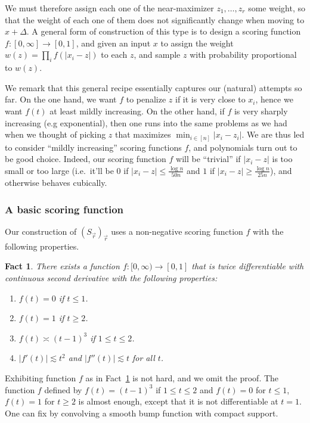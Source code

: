 \documentclass[10pt,a4paper]{article}
\newtheorem{fact}[thm]{Fact}
\newcommand\card[1]{\left| {#1} \right|}
\renewcommand\geq{\geqslant}
\renewcommand\leq{\leqslant}
\newcommand{\De}{\Delta}
\def\ll{\lesssim}
\def\ee{\asymp}
\begin{document}
We must therefore assign each one of the near-maximizer $z_1,\ldots,z_r$ some weight, so that the weight of each one of them does not significantly change when
moving to $x+\De$. A general form of construction of this type is to design a scoring function $f\colon[0,\infty]\to[0,1]$, and given an input $x$ to assign
the weight $w(z) = \prod\limits_{i}{f(\card{x_i - z})}$ to each $z$, and sample $z$ with probability proportional to $w(z)$.

We remark that this general recipe essentially captures our (natural) attempts so far. On the one hand, we want $f$ to penalize $z$
if it is very close to $x_i$, hence we want $f(t)$ at least mildly increasing. On the other hand, if $f$ is very sharply increasing (e.g exponential),
then one runs into the same problems as we had when we thought of picking $z$ that maximizes $\min_{i\in[n]}{\card{x_i - z_i}}$. We are thus
led to consider ``mildly increasing'' scoring functions $f$, and polynomials turn out to be good choice. Indeed, our scoring function $f$ will
be ``trivial'' if $\card{x_i - z}$ is too small or too large (i.e.\ it'll be $0$ if $\card{x_i-z}\leq \frac{\log n}{50 n}$ and $1$ if
$\card{x_i-z}\geq \frac{\log n}{25 n}$), and otherwise behaves cubically.

\subsubsection{A basic scoring function}
Our construction of $(S_{\vec{r}})_{\vec{r}}$ uses a non-negative scoring function $f$ with the following properties.
\begin{fact}\label{fact:std_fn}
There exists a function $f\colon [0,\infty)\to [0,1]$ that is twice differentiable with
continuous second derivative with the following properties:
\begin{enumerate}
  \item $f(t) = 0$ if $t\leq 1$.
  \item $f(t) = 1$ if $t\geq 2$.
  \item $f(t) \ee (t-1)^3$ if $1\leq t\leq 2$.
  \item $\card{f'(t)}\ll t^2$ and $\card{f''(t)}\ll t$ for all $t$.
\end{enumerate}
\end{fact}
Exhibiting function $f$ as in Fact~\ref{fact:std_fn} is not hard, and we omit the proof.
The function $f$ defined by $f(t) = (t-1)^3$ if $1\leq t\leq 2$ and $f(t) = 0$ for $t\leq 1$,
$f(t) = 1$ for $t\geq 2$ is almost enough, except that it is not differentiable at $t=1$. One
can fix by convolving a smooth bump function with compact support.
\end{document}
